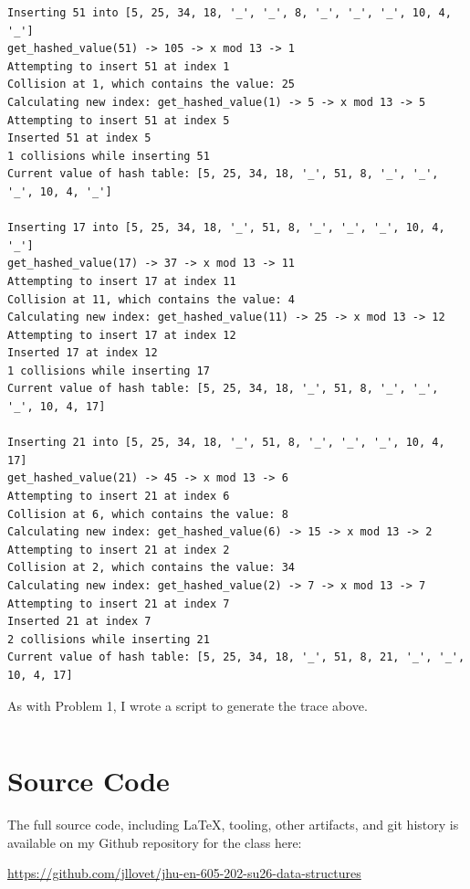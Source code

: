 \documentclass[10pt,letterpaper,final]{report}
\begin{document}
\begin{verbatim}
Inserting 51 into [5, 25, 34, 18, '_', '_', 8, '_', '_', '_', 10, 4, '_']
get_hashed_value(51) -> 105 -> x mod 13 -> 1
Attempting to insert 51 at index 1
Collision at 1, which contains the value: 25
Calculating new index: get_hashed_value(1) -> 5 -> x mod 13 -> 5
Attempting to insert 51 at index 5
Inserted 51 at index 5
1 collisions while inserting 51
Current value of hash table: [5, 25, 34, 18, '_', 51, 8, '_', '_', '_', 10, 4, '_']

Inserting 17 into [5, 25, 34, 18, '_', 51, 8, '_', '_', '_', 10, 4, '_']
get_hashed_value(17) -> 37 -> x mod 13 -> 11
Attempting to insert 17 at index 11
Collision at 11, which contains the value: 4
Calculating new index: get_hashed_value(11) -> 25 -> x mod 13 -> 12
Attempting to insert 17 at index 12
Inserted 17 at index 12
1 collisions while inserting 17
Current value of hash table: [5, 25, 34, 18, '_', 51, 8, '_', '_', '_', 10, 4, 17]

Inserting 21 into [5, 25, 34, 18, '_', 51, 8, '_', '_', '_', 10, 4, 17]
get_hashed_value(21) -> 45 -> x mod 13 -> 6
Attempting to insert 21 at index 6
Collision at 6, which contains the value: 8
Calculating new index: get_hashed_value(6) -> 15 -> x mod 13 -> 2
Attempting to insert 21 at index 2
Collision at 2, which contains the value: 34
Calculating new index: get_hashed_value(2) -> 7 -> x mod 13 -> 7
Attempting to insert 21 at index 7
Inserted 21 at index 7
2 collisions while inserting 21
Current value of hash table: [5, 25, 34, 18, '_', 51, 8, 21, '_', '_', 10, 4, 17]
\end{verbatim}

\pagebreak

As with Problem 1, I wrote a script to generate the trace above.

\inputminted[breaklines, breakanywhere, fontsize=\footnotesize, frame=single, fontsize=\footnotesize]{python}{problem2-rehashing.py}

\pagebreak

\section*{Source Code}
The full source code, including LaTeX, tooling, other artifacts, and git history is available on my Github repository for the class here:
\begin{center}
  \url{https://github.com/jllovet/jhu-en-605-202-su26-data-structures}
\end{center}

\printbibliography
\end{document}
